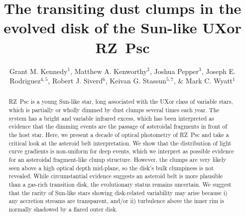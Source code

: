 \documentclass[]{rsos}
\begin{document}
\title[The transiting dust clumps of RZ~Psc]{The transiting dust clumps in the evolved
  disk of the Sun-like UXor RZ~Psc}

\author[Grant M. Kennedy et al]{Grant M. Kennedy$^1$,
  Matthew A. Kenworthy$^2$,
  Joshua Pepper$^3$,
  Joseph E. Rodriguez$^{4,5}$, 
  Robert J. Siverd$^6$,
  Keivan G. Stassun$^{5,7}$, \&
  Mark C. Wyatt$^1$}

\address{\footnotesize{$^1$ Institute of Astronomy, University of Cambridge, Madingley Road, Cambridge CB3
  0HA, UK \\
  $^2$ Leiden Observatory, Leiden University, PO Box 9513, NL-2300 RA Leiden, the
  Netherlands \\
  $^3$ Department of Physics, Lehigh University, 16 Memorial Drive East, Bethlehem, PA
  18015, USA \\
  $^4$ Harvard-Smithsonian Center for Astrophysics, 60 Garden Street, MS-78, Cambridge, MA
  02138, USA \\
  $^5$ Department of Physics and Astronomy, Vanderbilt University, 6301 Stevenson Center,
  Nashville, TN 37235, USA \\
  $^6$ Las Cumbres Observatory Global Telescope Network, 6740 Cortona Dr., Suite 102, Santa
  Barbara, CA 93117, USA \\
  $^7$ Department of Physics, Fisk University, 1000 17th Avenue North, Nashville, TN
  37208, USA \\
}}

\subject{astrophysics, extrasolar planets, stars}



\begin{fmtext}
\end{fmtext}

\begin{abstract}
  RZ~Psc is a young Sun-like star, long associated with the UXor class of variable stars,
  which is partially or wholly dimmed by dust clumps several times each year. The system
  has a bright and variable infrared excess, which has been interpreted as evidence that
  the dimming events are the passage of asteroidal fragments in front of the host
  star. Here, we present a decade of optical photometry of RZ~Psc and take a critical
  look at the asteroid belt interpretation. We show that the distribution of light curve
  gradients is non-uniform for deep events, which we interpret as possible evidence for
  an asteroidal fragment-like clump structure. However, the clumps are very likely seen
  above a high optical depth mid-plane, so the disk's bulk clumpiness is not
  revealed. While circumstantial evidence suggests an asteroid belt is more plausible
  than a gas-rich transition disk, the evolutionary status remains uncertain. We suggest
  that the rarity of Sun-like stars showing disk-related variability may arise because i)
  any accretion streams are transparent, and/or ii) turbulence above the inner rim is
  normally shadowed by a flared outer disk.
\end{abstract}
\end{document}
